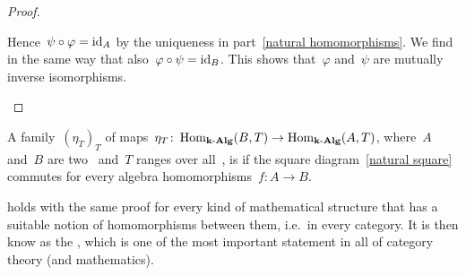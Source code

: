 \begin{proof}
\begin{enumerate}
      Hence~$\psi \circ \varphi = \operatorname{id}_A$ by the uniqueness in part~\ref*{natural homomorphisms}.
      We find in the same way that also~$\varphi \circ \psi = \operatorname{id}_B$.
      This shows that~$\varphi$ and~$\psi$ are mutually inverse isomorphisms.
    \qedhere
  \end{enumerate}
\end{proof}


\begin{definition}
  A family~$(\eta_T)_T$ of maps~$\eta_T \colon \operatorname{Hom}_{\mathbf{k}\text{-}\mathbf{Alg}}(B,T) \to \operatorname{Hom}_{\mathbf{k}\text{-}\mathbf{Alg}}(A,T)$, where~$A$ and~$B$ are two~{\algebras{$\kf$}} and~$T$ ranges over all~{\algebras{$\kf$}}, is  if the square diagram~\eqref{natural square} commutes for every algebra homomorphisms~$f \colon A \to B$.
\end{definition}


\begin{remark}
   holds with the same proof for every kind of mathematical structure that has a suitable notion of homomorphisms between them, i.e.\ in every category.
  It is then know as the , which is one of the most important statement in all of category theory (and mathematics).
\end{remark}











